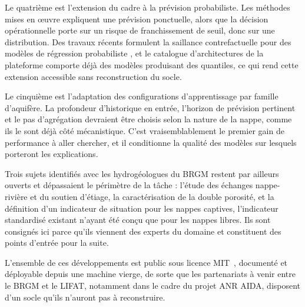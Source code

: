 Le quatrième est l'extension du cadre à la prévision probabiliste. Les méthodes mises en œuvre expliquent une prévision ponctuelle, alors que la décision opérationnelle porte sur un risque de franchissement de seuil, donc sur une distribution. Des travaux récents formulent la saillance contrefactuelle pour des modèles de régression probabiliste \cite{raman2023information}, et le catalogue d'architectures de la plateforme comporte déjà des modèles produisant des quantiles, ce qui rend cette extension accessible sans reconstruction du socle.

Le cinquième est l'adaptation des configurations d'apprentissage par famille d'aquifère. La profondeur d'historique en entrée, l'horizon de prévision pertinent et le pas d'agrégation devraient être choisis selon la nature de la nappe, comme ils le sont déjà côté mécanistique. C'est vraisemblablement le premier gain de performance à aller chercher, et il conditionne la qualité des modèles sur lesquels porteront les explications.

Trois sujets identifiés avec les hydrogéologues du BRGM restent par ailleurs ouverts et dépassaient le périmètre de la tâche : l'étude des échanges nappe-rivière et du soutien d'étiage, la caractérisation de la double porosité, et la définition d'un indicateur de situation pour les nappes captives, l'indicateur standardisé existant n'ayant été conçu que pour les nappes libres. Ils sont consignés ici parce qu'ils viennent des experts du domaine et constituent des points d'entrée pour la suite.

L'ensemble de ces développements est public sous licence MIT~\cite{depot_entrepot, depot_plateforme}, documenté et déployable depuis une machine vierge, de sorte que les partenariats à venir entre le BRGM et le LIFAT, notamment dans le cadre du projet ANR AIDA, disposent d'un socle qu'ils n'auront pas à reconstruire.
